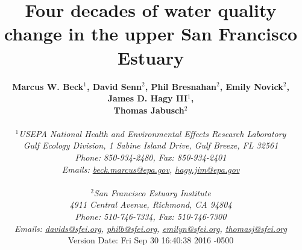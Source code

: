 \documentclass[letterpaper,12pt,oneside]{article}\usepackage[]{graphicx}\usepackage[]{color}
\begin{document}
\raggedbottom
\linenumbers
\raggedright
{}
\setlength{\parindent}{0.5in}
\renewcommand\refname{References \vspace{12pt}}

\begin{singlespace}
\title{{\bf {\Large Four decades of water quality change in the upper San Francisco Estuary}}}
\author{
  {\bf {\normalsize Marcus W. Beck$^1$, David Senn$^2$, Phil Bresnahan$^2$, Emily Novick$^2$, James D. Hagy III$^1$,}}
  \\{\bf {\normalsize Thomas Jabusch$^2$}}
  \\\\{\textit {\normalsize $^1$USEPA National Health and Environmental Effects Research Laboratory}}
  \\{\textit {\normalsize Gulf Ecology Division, 1 Sabine Island Drive, Gulf Breeze, FL 32561}}
	\\{\textit {\normalsize Phone: 850-934-2480, Fax: 850-934-2401}}
	\\{\textit {\normalsize Emails: \href{mailto:beck.marcus@epa.gov}{beck.marcus@epa.gov}, \href{mailto:hagy.jim@epa.gov}{hagy.jim@epa.gov}}}
  \\\\{\textit {\normalsize $^2$San Francisco Estuary Institute}}
	\\{\textit {\normalsize 4911 Central Avenue, Richmond, CA 94804}}
	\\{\textit {\normalsize Phone: 510-746-7334, Fax: 510-746-7300}}
	\\{\textit {\normalsize Emails: \href{mailto:davids@sfei.org}{davids@sfei.org}, \href{mailto:philb@sfei.org}{philb@sfei.org}, \href{mailto:emilyn@sfei.org}{emilyn@sfei.org}, \href{mailto:thomasj@sfei.org}{thomasj@sfei.org}}}
  \vspace{1in} 
  \\ Version Date:   Fri Sep 30 16:40:38 2016 -0500
	}
\date{}
\maketitle
\end{singlespace}
\clearpage
\end{document}

